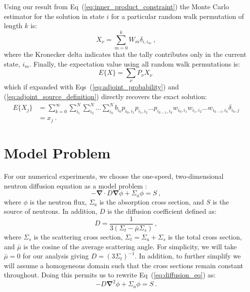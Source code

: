 \documentclass[preprint,11pt]{elsarticle}
\begin{document}
Using our result from Eq~(\ref{eq:inner_product_constraint}) the Monte Carlo
estimator for the solution in state $i$ for a particular random walk
permutation of length $k$ is:
\begin{equation}
  X_{\nu} = \sum_{m=0}^k W_{m} \delta_{i,i_m}\:,
  \label{eq:adjoint_permutation_contribution}
\end{equation}
where the Kronecker delta indicates that the tally contributes only in the
current state, $i_m$. Finally, the expectation value using all random walk
permutations is:
\begin{equation}
  E\{X\} = \sum_{\nu} P_{\nu} X_{\nu}\:
  \label{eq:adjoint_expectation_value}
\end{equation}
which if expanded with Eqs~(\ref{eq:adjoint_probability}) and
(\ref{eq:adjoint_source_definition}) directly recovers the exact solution:
\begin{equation}
  \begin{split}
    E\{X_j\} &=\sum_{k=0}^{\infty}\sum_{i_1}^{N}\sum_{i_2}^{N}\ldots
    \sum_{i_k}^{N} b_{i_0} p_{i_0,i_1}p_{i_1,i_2}\ldots
    p_{i_{k-1},i_k} w_{i_0,i_1}w_{i_1,i_2}\ldots
    w_{i_{k-1},i_k} \delta_{i_k,j} \\ &= x_{j}\:.
  \end{split}
  \label{eq:adjoint_expectation_expansion}
\end{equation}

\section{Model Problem}
\label{sec:model_problem}

For our numerical experiments, we choose the one-speed,
two-dimensional neutron diffusion equation as a model problem
\cite{duderstadt_nuclear_1976}:
\begin{equation}
  -\boldsymbol{\nabla} \cdot D \boldsymbol{\nabla} \phi + \Sigma_a
  \phi = S\:,
  \label{eq:diffusion_eq}
\end{equation}
where $\phi$ is the neutron flux, $\Sigma_a$ is the absorption cross
section, and $S$ is the source of neutrons. In addition, $D$ is the
diffusion coefficient defined as:
\begin{equation}
  D = \frac{1}{3 ( \Sigma_t - \bar{\mu}\Sigma_s )}\:,
  \label{eq:diffusion_coeff}
\end{equation}
where $\Sigma_s$ is the scattering cross section, $\Sigma_t = \Sigma_a
+ \Sigma_s$ is the total cross section, and $\bar{\mu}$ is the cosine
of the average scattering angle. For simplicity, we will take
$\bar{\mu} = 0$ for our analysis giving $D=(3 \Sigma_t)^{-1}$. In
addition, to further simplify we will assume a homogeneous domain such
that the cross sections remain constant throughout. Doing this permits
us to rewrite Eq~(\ref{eq:diffusion_eq}) as:
\begin{equation}
  -D \boldsymbol{\nabla}^2 \phi + \Sigma_a \phi = S\:.
  \label{eq:diffusion_eq_simple}
\end{equation}
\end{document}
